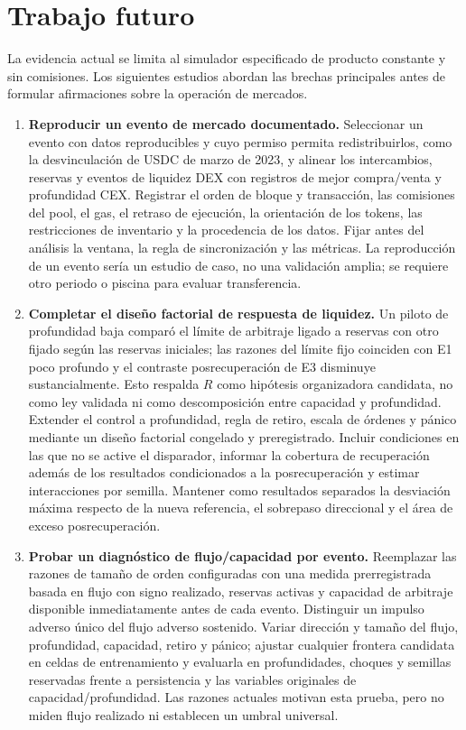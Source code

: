 \chapter{Trabajo futuro}
\label{cap:futuro}

La evidencia actual se limita al simulador especificado de producto constante y sin comisiones. Los siguientes estudios abordan las brechas principales antes de formular afirmaciones sobre la operación de mercados.

\begin{enumerate}
  \item \textbf{Reproducir un evento de mercado documentado.} Seleccionar un evento con datos reproducibles y cuyo permiso permita redistribuirlos, como la desvinculación de USDC de marzo de 2023, y alinear los intercambios, reservas y eventos de liquidez DEX con registros de mejor compra/venta y profundidad CEX. Registrar el orden de bloque y transacción, las comisiones del pool, el gas, el retraso de ejecución, la orientación de los tokens, las restricciones de inventario y la procedencia de los datos. Fijar antes del análisis la ventana, la regla de sincronización y las métricas. La reproducción de un evento sería un estudio de caso, no una validación amplia; se requiere otro periodo o piscina para evaluar transferencia.
  \item \textbf{Completar el diseño factorial de respuesta de liquidez.} Un piloto de profundidad baja comparó el límite de arbitraje ligado a reservas con otro fijado según las reservas iniciales; las razones del límite fijo coinciden con E1 poco profundo y el contraste posrecuperación de E3 disminuye sustancialmente. Esto respalda $R$ como hipótesis organizadora candidata, no como ley validada ni como descomposición entre capacidad y profundidad. Extender el control a profundidad, regla de retiro, escala de órdenes y pánico mediante un diseño factorial congelado y preregistrado. Incluir condiciones en las que no se active el disparador, informar la cobertura de recuperación además de los resultados condicionados a la posrecuperación y estimar interacciones por semilla. Mantener como resultados separados la desviación máxima respecto de la nueva referencia, el sobrepaso direccional y el área de exceso posrecuperación.
  \item \textbf{Probar un diagnóstico de flujo/capacidad por evento.} Reemplazar las razones de tamaño de orden configuradas con una medida prerregistrada basada en flujo con signo realizado, reservas activas y capacidad de arbitraje disponible inmediatamente antes de cada evento. Distinguir un impulso adverso único del flujo adverso sostenido. Variar dirección y tamaño del flujo, profundidad, capacidad, retiro y pánico; ajustar cualquier frontera candidata en celdas de entrenamiento y evaluarla en profundidades, choques y semillas reservadas frente a persistencia y las variables originales de capacidad/profundidad. Las razones actuales motivan esta prueba, pero no miden flujo realizado ni establecen un umbral universal.

\end{enumerate}
